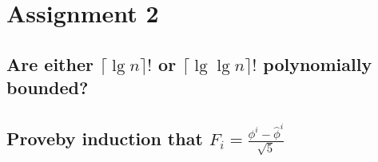 \chapter{Assignment 2}

\section[Problem 1]{Are either $\lceil \lg n \rceil!$ or $\lceil \lg \lg n \rceil!$ polynomially bounded?}


\section[Problem 2]{Proveby induction that $F_i = \frac{\phi^i - \hat{\phi}^i}{\sqrt{5}}$}
